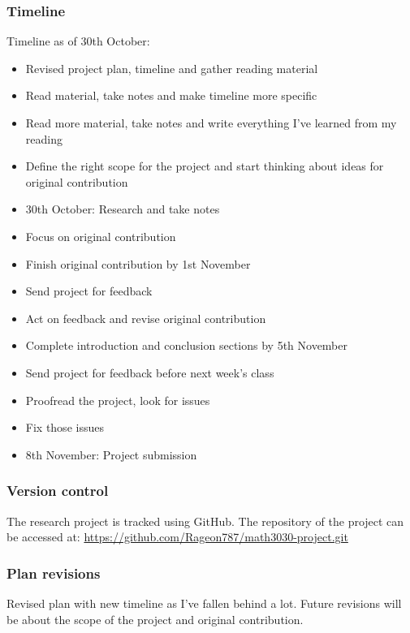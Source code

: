 \documentclass[a4paper, 11pt]{article}
\begin{document}
\subsubsection*{Timeline}
Timeline as of 30th October:
\begin{itemize}
  \item[$\boxtimes$] Revised project plan, timeline and gather reading material
  \item[$\boxtimes$] Read material, take notes and make timeline more specific
  \item[$\boxtimes$] Read more material, take notes and write everything I've learned from my reading
  \item[$\boxtimes$] Define the right scope for the project and start thinking about ideas for original contribution
  \item[$\boxtimes$] 30th October: Research and take notes
  \item[$\square$] Focus on original contribution
  \item[$\square$] Finish original contribution by 1st November
  \item[$\square$] Send project for feedback
  \item[$\square$] Act on feedback and revise original contribution
  \item[$\square$] Complete introduction and conclusion sections by 5th November
  \item[$\square$] Send project for feedback before next week's class
  \item[$\square$] Proofread the project, look for issues
  \item[$\square$] Fix those issues
  \item[$\square$] 8th November: Project submission
\end{itemize}

\subsubsection*{Version control}
The research project is tracked using GitHub. The repository of the project can be accessed at: \url{https://github.com/Rageon787/math3030-project.git}

\subsubsection*{Plan revisions}
Revised plan with new timeline as I've fallen behind a lot. Future revisions will be about the scope of the project and original contribution.
\end{document}
